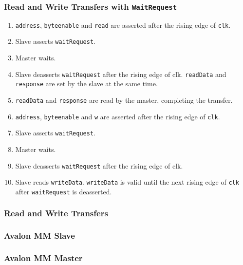 		\subsubsection{Read and Write Transfers with \texttt{WaitRequest} }		
			\begin{enumerate}
				\item \texttt{address}, \texttt{byteenable} and \texttt{read} are asserted after the rising edge of \texttt{clk}.
				\item Slave asserts \texttt{waitRequest}.
				\item Master waits.
				\item Slave deasserts \texttt{waitRequest} after the rising edge of clk. \texttt{readData} and \texttt{response} are set by the slave at the same time.
				\item \texttt{readData} and \texttt{response} are read by the master, completing the transfer.
				  
				\item \texttt{address}, \texttt{byteenable} and \texttt{w} are asserted after the rising edge of \texttt{clk}.
				\item Slave asserts \texttt{waitRequest}.
				\item Master waits.
				\item Slave deasserts \texttt{waitRequest} after the rising edge of clk.
				\item Slave reads \texttt{writeData}. \texttt{writeData} is valid until the next rising edge of \texttt{clk} after \texttt{waitRequest} is deasserted.
			\end{enumerate}

		\subsubsection{Read and Write Transfers }
		\subsubsection{Avalon MM Slave}
			
			
			
		\subsubsection{Avalon MM Master}
		
		
		
			